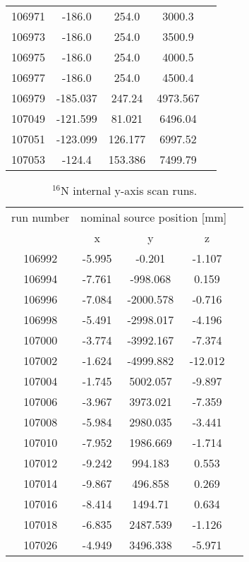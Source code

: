 \begin{table}[ht]
\begin{tabular*}{90mm}{c@{\extracolsep{\fill}}*4c}
        106971 &-186.0 & 254.0 & 3000.3\\
        106973 &-186.0 & 254.0 & 3500.9\\
        106975 &-186.0 & 254.0 & 4000.5\\
        106977 &-186.0 & 254.0 & 4500.4\\
        106979 &-185.037 & 247.24 & 4973.567\\
        107049 & -121.599 & 81.021 & 6496.04 \\
        107051 & -123.099 & 126.177 & 6997.52\\
        107053	&	-124.4 & 153.386 & 7499.79\\
        \bottomrule	
	\end{tabular*}
\end{table}        
        
\begin{table}[ht]
		\caption[]{$^{16}$N internal y-axis scan runs.}
		\label{table:n16scanTable_yscan}
				\centering
	\begin{tabular*}{90mm}{c@{\extracolsep{\fill}}*4c}
		\toprule 
		run number  & \multicolumn{3}{c}{nominal source position [mm]}  \\
		\cline{2-4}
		& x & y & z\\
		\midrule        
        106992 & -5.995 & -0.201 & -1.107\\
        106994 & -7.761 & -998.068 & 0.159\\
        106996 & -7.084 & -2000.578 & -0.716\\
        106998 & -5.491 & -2998.017 & -4.196\\
        107000 & -3.774 & -3992.167 & -7.374\\
        107002 & -1.624 & -4999.882 & -12.012\\
        107004 & -1.745 & 5002.057 & -9.897\\
        107006 & -3.967 & 3973.021 & -7.359\\
        107008 & -5.984 & 2980.035 & -3.441\\
        107010 & -7.952 & 1986.669 & -1.714\\
        107012 & -9.242 & 994.183 & 0.553\\
        107014 & -9.867 & 496.858 & 0.269\\
        107016 & -8.414 & 1494.71 & 0.634\\
        107018 & -6.835 & 2487.539 & -1.126\\
        107026 & -4.949 & 3496.338 & -5.971\\

\end{tabular*}
\end{table}
